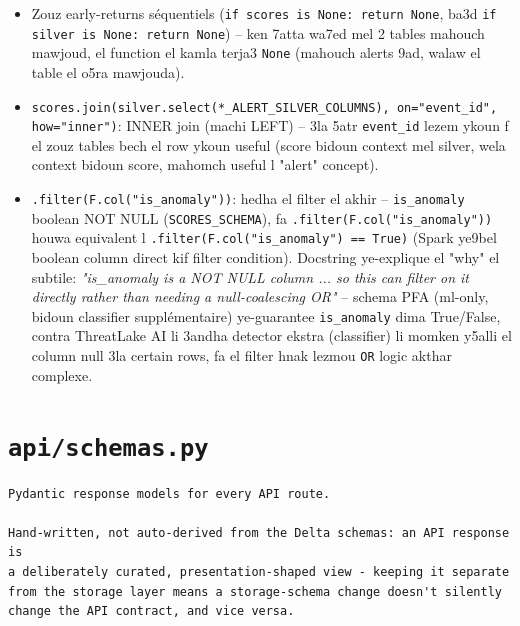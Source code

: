 \documentclass[11pt,a4paper]{report}
\DeclareRobustCommand{\code}[1]{\texttt{#1}}
\DeclareRobustCommand{\file}[1]{\texttt{\color{amber}#1}}
\begin{document}
\begin{itemize}
  \item Zouz early-returns séquentiels (\code{if scores is None: return
        None}, ba3d \code{if silver is None: return None}) -- ken 7atta
        wa7ed mel 2 tables mahouch mawjoud, el function el kamla terja3
        \code{None} (mahouch alerts 9ad, walaw el table el o5ra mawjouda).
  \item \code{scores.join(silver.select(*\_ALERT\_SILVER\_COLUMNS),
        on="event\_id", how="inner")}: INNER join (machi LEFT) -- 3la
        5atr \code{event\_id} lezem ykoun f el zouz tables bech el row
        ykoun useful (score bidoun context mel silver, wela context
        bidoun score, mahomch useful l "alert" concept).
  \item \code{.filter(F.col("is\_anomaly"))}: hedha el filter el akhir --
        \code{is\_anomaly} boolean NOT NULL (\code{SCORES\_SCHEMA}), fa
        \code{.filter(F.col("is\_anomaly"))} houwa equivalent l
        \code{.filter(F.col("is\_anomaly") == True)} (Spark ye9bel boolean
        column direct kif filter condition). Docstring ye-explique el
        "why" el subtile: \emph{"is\_anomaly is a NOT NULL column ...
        so this can filter on it directly rather than needing a
        null-coalescing OR"} -- schema PFA (ml-only, bidoun classifier
        supplémentaire) ye-guarantee \code{is\_anomaly} dima True/False,
        contra ThreatLake AI li 3andha detector ekstra (classifier) li
        momken y5alli el column null 3la certain rows, fa el filter
        hnak lezmou \code{OR} logic akthar complexe.
\end{itemize}

\section{\file{api/schemas.py}}

\begin{lstlisting}[style=pystyle]
Pydantic response models for every API route.

Hand-written, not auto-derived from the Delta schemas: an API response is
a deliberately curated, presentation-shaped view - keeping it separate
from the storage layer means a storage-schema change doesn't silently
change the API contract, and vice versa.
\end{lstlisting}
\end{document}

